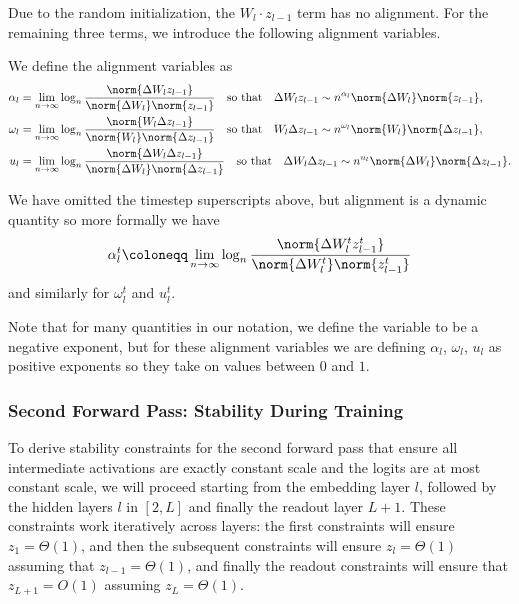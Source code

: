 Due to the random initialization, the $W_l \cdot z_{l-1}$ term has no alignment. For the remaining three terms, we introduce the following alignment variables.
\begingroup
\begin{appendixdef} We define the alignment variables as
\begin{align*}
\alpha_l &=  \lim_{n \rightarrow \infty} \log_n \frac{\norm{ \Delta W_l z_{l-1}}}{\norm{\Delta W_l} \norm{z_{l-1}}}\quad\textrm{so that}\quad\Delta W_l z_{l-1} \sim n^{\alpha_l} \norm{\Delta W_l}\norm{z_{l-1}},\\
\omega_l &=  \lim_{n \rightarrow \infty} \log_n \frac{\norm{W_l \Delta z_{l-1}}}{\norm{W_l}\norm{\Delta z_{l-1}}}\quad\textrm{so that}\quad W_l\Delta z_{l-1} \sim n^{\omega_l} \norm{ W_l}\norm{\Delta z_{l-1}},\\
u_l &= \lim_{n \rightarrow \infty} \log_n \frac{\norm{\Delta W_l \Delta z_{l-1}}}{\norm{\Delta W_l}\norm{\Delta z_{l-1}}}\quad\textrm{so that}\quad \Delta W_l \Delta z_{l-1} \sim n^{u_l} \norm{\Delta W_l}\norm{\Delta z_{l-1}}.\\
\end{align*}
\end{appendixdef}
\endgroup
We have omitted the timestep superscripts above, but alignment is a dynamic quantity so more formally we have 
\begin{align*}
\alpha_l^t \coloneqq  \lim_{n \rightarrow \infty} \log_n \frac{\norm{ \Delta W_l^t z_{l-1}^t}}{\norm{\Delta W_l^t} \norm{z_{l-1}^t}}
\end{align*}
and similarly for $\omega_l^t$ and $u_l^t$.

Note that for many quantities in our notation, we define the variable to be a negative exponent, but for these alignment variables we are defining $\alpha_l$, $\omega_l$, $u_l$ as positive exponents so they take on values between $0$ and $1$.




\subsubsection{Second Forward Pass: Stability During Training}
\label{app:theory_second_forward}
To derive stability constraints for the second forward pass that ensure all intermediate activations are exactly constant scale and the logits are at most constant scale, we will proceed starting from the embedding layer $l$, followed by the hidden layers $l$ in $[2,L]$ and finally the readout layer $L+1$. These constraints work iteratively across layers: the first constraints will ensure $z_1 = \Theta(1)$, and then the subsequent constraints will ensure $z_{l} = \Theta(1)$ assuming that $z_{l-1} = \Theta(1)$, and finally the readout constraints will ensure that $z_{L+1} = O(1)$ assuming $z_{L} = \Theta(1)$.

